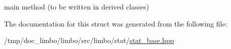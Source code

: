 main method (to be written in derived classes) 



The documentation for this struct was generated from the following file\+:\begin{DoxyCompactItemize}
\item 
/tmp/doc\+\_\+limbo/limbo/src/limbo/stat/\hyperlink{stat__base_8hpp}{stat\+\_\+base.\+hpp}\end{DoxyCompactItemize}
